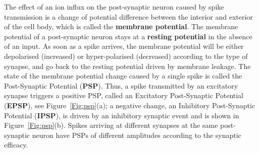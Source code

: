The effect of an ion influx on the post-synaptic neuron caused by spike transmission is a change of potential difference between the interior and exterior of the cell body, which is called the \textbf{membrane potential}.
The membrane potential of a post-synaptic neuron stays at a \textbf{resting potential} in the absence of an input.
As soon as a spike arrives, the membrane potential will be either depolarised (increased) or hyper-polarised (decreased) according to the type of synapse, and go back to the resting potential driven by membrane leakage.
The state of the membrane potential change caused by a single spike is called the Post-Synaptic Potential (\textbf{PSP}). 
Thus, a spike transmitted by an excitatory synapse triggers a positive PSP, called an Excitatory Post-Synaptic Potential (\textbf{EPSP}), see Figure~\ref{Fig:psp}(a);
a negative change, an Inhibitory Post-Synaptic Potential (\textbf{IPSP}), is driven by an inhibitory synaptic event and is shown in Figure~\ref{Fig:psp}(b).
Spikes arriving at different synapses at the same post-synaptic neuron have PSPs of different amplitudes according to the synaptic efficacy.




